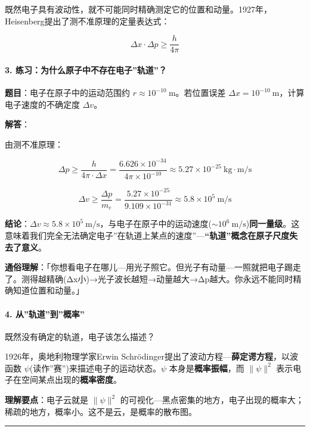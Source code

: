 既然电子具有波动性，就不可能同时精确测定它的位置和动量。1927年，Heisenberg提出了测不准原理的定量表达式：

\[
\boxed{\Delta x \cdot \Delta p \geq \frac{h}{4\pi}}
\]

\paragraph{3. 练习：为什么原子中不存在电子''轨道''？}\label{ux7ec3ux4e60ux4e3aux4ec0ux4e48ux539fux5b50ux4e2dux4e0dux5b58ux5728ux7535ux5b50ux8f68ux9053}

\textbf{题目}：电子在原子中的运动范围约 \(r \approx 10^{-10}\ \mathrm{m}\)。若位置误差 \(\Delta x = 10^{-10}\ \mathrm{m}\)，计算电子速度的不确定度 \(\Delta v\)。

\textbf{解答}：

由测不准原理：

\[\Delta p \geq \frac{h}{4\pi \cdot \Delta x} = \frac{6.626\times 10^{-34}}{4\pi \times 10^{-10}} \approx 5.27\times 10^{-25}\ \mathrm{kg\cdot m/s}\]

\[\Delta v \geq \frac{\Delta p}{m_e} = \frac{5.27\times 10^{-25}}{9.109\times 10^{-31}} \approx 5.8\times 10^5\ \mathrm{m/s}\]

\textbf{结论}：\(\Delta v \approx 5.8\times 10^5\ \mathrm{m/s}\)，与电子在原子中的运动速度(\(\sim 10^6\ \mathrm{m/s}\))\textbf{同一量级}。这意味着我们完全无法确定电子''在轨道上某点的速度''---\textbf{``轨道''概念在原子尺度失去了意义}。

\textbf{通俗理解}：「你想看电子在哪儿---用光子照它。但光子有动量---一照就把电子踢走了。测得越精确(Δx小)→光子波长越短→动量越大→Δp越大。你永远不能同时精确知道位置和动量。」

\paragraph{4. 从''轨道''到''概率''}\label{ux4eceux8f68ux9053ux5230ux6982ux7387}

既然没有确定的轨道，电子该怎么描述？

1926年，奥地利物理学家Erwin Schrödinger提出了波动方程---\textbf{薛定谔方程}，以波函数 \(\psi\)(读作''赛'')来描述电子的运动状态。\(\psi\) 本身是\textbf{概率振幅}，而 \(\|\psi\|^2\) 表示电子在空间某点出现的\textbf{概率密度}。

\textbf{理解要点}：电子云就是 \(\|\psi\|^2\) 的可视化---黑点密集的地方，电子出现的概率大；稀疏的地方，概率小。这不是云，是概率的散布图。

\begin{center}\rule{0.5\linewidth}{0.5pt}\end{center}

